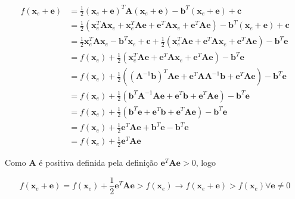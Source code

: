 \begin{align}
     f(\mathbf{x}_e + \mathbf{e}) & =  \frac{1}{2} (\mathbf{x}_e + \mathbf{e})^T \mathbf{A} (\mathbf{x}_e + \mathbf{e}) - \mathbf{b}^T(\mathbf{x}_e + \mathbf{e}) + \mathbf{c}  \nonumber\\
                & =  \frac{1}{2} (\mathbf{x}_e^T\mathbf{A}\mathbf{x}_e + \mathbf{x}_e^T\mathbf{A}\mathbf{e} + \mathbf{e}^T\mathbf{A}\mathbf{x}_e + \mathbf{e}^T\mathbf{A}\mathbf{e} )- \mathbf{b}^T(\mathbf{x}_e + \mathbf{e}) + \mathbf{c}  \nonumber\\
                & =  \frac{1}{2} \mathbf{x}_e^T\mathbf{A}\mathbf{x}_e -\mathbf{b}^T\mathbf{x}_e + \mathbf{c} + \frac{1}{2} ( \mathbf{x}_e^T\mathbf{A}\mathbf{e} + \mathbf{e}^T\mathbf{A}\mathbf{x}_e + \mathbf{e}^T\mathbf{A}\mathbf{e} ) - \mathbf{b}^T\mathbf{e}  \nonumber\\
                & =  f(\mathbf{x}_e) + \frac{1}{2} ( \mathbf{x}_e^T\mathbf{A}\mathbf{e} + \mathbf{e}^T\mathbf{A}\mathbf{x}_e + \mathbf{e}^T\mathbf{A}\mathbf{e} ) - \mathbf{b}^T\mathbf{e}  \nonumber\\
                & =  f(\mathbf{x}_e) + \frac{1}{2} ( (\mathbf{A}^{-1}\mathbf{b})^T\mathbf{A}\mathbf{e} + \mathbf{e}^T\mathbf{A}\mathbf{A}^{-1}\mathbf{b} + \mathbf{e}^T\mathbf{A}\mathbf{e} ) - \mathbf{b}^T\mathbf{e}  \nonumber\\
                & =  f(\mathbf{x}_e) + \frac{1}{2} ( \mathbf{b}^T\mathbf{A}^{-1}\mathbf{A}\mathbf{e} + \mathbf{e}^T\mathbf{b} + \mathbf{e}^T\mathbf{A}\mathbf{e} ) - \mathbf{b}^T\mathbf{e}  \nonumber\\
                & =  f(\mathbf{x}_e) + \frac{1}{2} ( \mathbf{b}^T\mathbf{e} + \mathbf{e}^T\mathbf{b} + \mathbf{e}^T\mathbf{A}\mathbf{e} ) - \mathbf{b}^T\mathbf{e}  \nonumber\\
                & =  f(\mathbf{x}_e) + \frac{1}{2}  \mathbf{e}^T\mathbf{A}\mathbf{e}  + \mathbf{b}^T\mathbf{e} - \mathbf{b}^T\mathbf{e}  \nonumber\\
                & =  f(\mathbf{x}_e) + \frac{1}{2}  \mathbf{e}^T\mathbf{A}\mathbf{e} \nonumber
\end{align}


Como $\mathbf{A}$ é positiva definida pela definição $\mathbf{e}^T\mathbf{A}\mathbf{e}  > 0$, logo

\begin{equation}
    f(\mathbf{x}_e + \mathbf{e}) = f(\mathbf{x}_e) + \frac{1}{2}  \mathbf{e}^T\mathbf{A}\mathbf{e} > f(\mathbf{x}_e)\rightarrow  f(\mathbf{x}_e + \mathbf{e}) > f(\mathbf{x}_e) \forall \mathbf{e} \neq 0
\end{equation}


